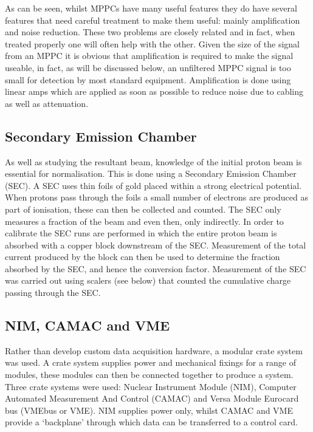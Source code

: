 As can be seen, whilst MPPCs have many useful features they do have several features that need careful treatment to make them useful: mainly amplification and noise reduction. These two problems are closely related and in fact, when treated properly one will often help with the other. Given the size of the signal from an MPPC it is obvious that amplification is required to make the signal useable, in fact, as will be discussed below, an unfiltered MPPC signal is too small for detection by most standard equipment. Amplification is done using linear amps which are applied as soon as possible to reduce noise due to cabling as well as attenuation. 

\subsection{Secondary Emission Chamber} %
\label{sub:secondary_emission_chamber}
As well as studying the resultant beam, knowledge of the initial proton beam is essential for normalisation. This is done using a Secondary Emission Chamber (SEC). A SEC uses thin foils of gold placed within a strong electrical potential. When protons pass through the foils a small number of electrons are produced as part of ionisation, these can then be collected and counted. The SEC only measures a fraction of the beam and even then, only indirectly. In order to calibrate the SEC runs are performed in which the entire proton beam is absorbed with a copper block downstream of the SEC. Measurement of the total current produced by the block can then be used to determine the fraction absorbed by the SEC, and hence the conversion factor. Measurement of the SEC was carried out using scalers (see below) that counted the cumulative charge passing through the SEC.


\subsection{NIM, CAMAC and VME} %
\label{sub:nim_and_camac}
Rather than develop custom data acquisition hardware, a modular crate system was used. A crate system supplies power and mechanical fixings for a range of modules, these modules can then be connected together to produce a system. Three crate systems were used: Nuclear Instrument Module (NIM), Computer Automated Measurement And Control (CAMAC) and Versa Module Eurocard bus (VMEbus or VME). NIM supplies power only, whilst CAMAC and VME provide a `backplane' through which data can be transferred to a control card.

